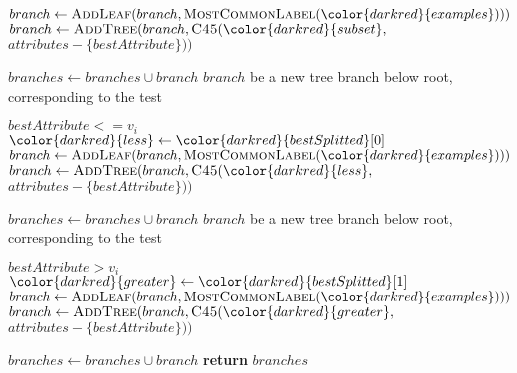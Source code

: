 \begin{algorithm}[H]
\begin{algorithmic}[1]
              \State $branch \gets \textsc{AddLeaf}(branch, \textsc{MostCommonLabel}({\color{darkred}{examples}})))$
          \Else
              \State $branch \gets \textsc{AddTree}(branch, \textsc{C45}({\color{darkred}{subset}},$ $attributes - \{bestAttribute\}))$\par\hfill
          \EndIf
          \State $branches \gets branches \cup branch$
      \EndFor
    \Else
       $branch$ {\small be a new tree branch below root, corresponding to the test}  \par\hfill $bestAttribute <= v_i$
      \State ${\color{darkred}{less}} \gets {\color{darkred}{bestSplitted}}[0]$
          \State $branch \gets \textsc{AddLeaf}(branch, \textsc{MostCommonLabel}({\color{darkred}{examples}})))$
      \Else
          \State $branch \gets \textsc{AddTree}(branch, \textsc{C45}({\color{darkred}{less}},$ $attributes - \{bestAttribute\}))$\par\hfill
      \EndIf
      \State $branches \gets branches \cup branch$
       $branch$ {\small be a new tree branch below root, corresponding to the test}  \par\hfill $bestAttribute > v_i$
      \State ${\color{darkred}{greater}} \gets {\color{darkred}{bestSplitted}}[1]$
          \State $branch \gets \textsc{AddLeaf}(branch, \textsc{MostCommonLabel}({\color{darkred}{examples}})))$
      \Else
          \State $branch \gets \textsc{AddTree}(branch, \textsc{C45}({\color{darkred}{greater}},$ $attributes - \{bestAttribute\}))$\par\hfill
      \EndIf
      \State $branches \gets branches \cup branch$
    \EndIf
    \State \textbf{return} $branches$
\EndProcedure
\end{algorithmic}
\end{algorithm}

